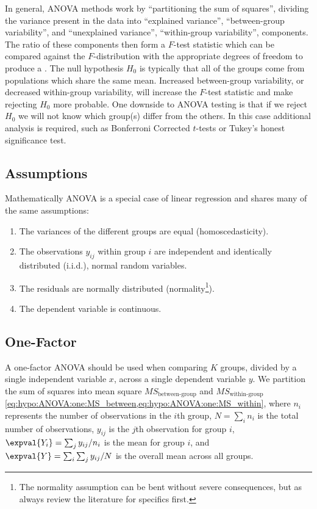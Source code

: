 In general, ANOVA methods work by ``partitioning the sum of squares'',
\ie dividing the variance present in the data into
``explained variance'', \ie ``between-group variability'',
and
``unexplained variance'', \ie ``within-group variability'',
components.
The ratio of these components then form a $F$-test statistic
which can be compared against the $F$-distribution
with the appropriate degrees of freedom to produce a \pvalue.
The null hypothesis $H_{0}$ is typically that all of the groups come from populations which share the same mean.
Increased between-group variability, or decreased within-group variability,
will increase the $F$-test statistic and make rejecting $H_{0}$ more probable.
One downside to ANOVA testing is that if we reject $H_{0}$
we will not know which group(s) differ from the others.
In this case additional \posthoc analysis is required,
such as Bonferroni Corrected $t$-tests or Tukey's honest significance test.

\subsection{Assumptions}
\label{hypo:ANOVA:assumptions}

Mathematically ANOVA is a special case of linear regression
and shares many of the same assumptions:

\begin{enumerate}[noitemsep]
\item The variances of the different groups are equal (homoscedasticity).
\item The observations $y_{ij}$ within group $i$ are independent and identically distributed (i.i.d.), normal random variables.
\item The residuals are normally distributed (normality\footnote{The normality assumption can be bent without severe consequences, but as always review the literature for specifics first.}).
\item The dependent variable is continuous.
\end{enumerate}

\subsection{One-Factor}
\label{hypo:ANOVA:one}

A one-factor ANOVA should be used when comparing $K$ groups,
divided by a single independent variable $x$,
across a single dependent variable $y$.
We partition the sum of squares into
mean square $MS_{\text{between-group}}$ and $MS_{\text{within-group}}$
\cref{eq:hypo:ANOVA:one:MS_between,eq:hypo:ANOVA:one:MS_within}, where
$n_{i}$ represents the number of observations in the $i$th group,
$N = \sum_{i} n_{i}$ is the total number of observations,
$y_{ij}$ is the $j$th observation for group $i$,
$\expval{Y_{i}} = \sum_{j} y_{ij} / n_{i}$ is the mean for group $i$,
and $\expval{Y} = \sum_{i}\sum_{j} y_{ij} / N$ is the overall mean across all groups.

